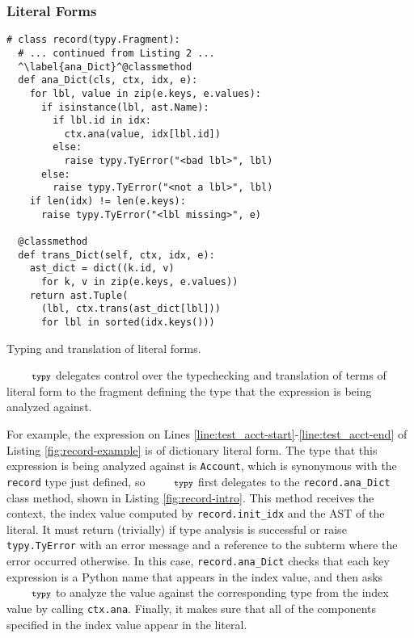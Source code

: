 \documentclass[10pt]{sigplanconf}
\newcommand{\typy}{\texttt{\footnotesize typy}}
\newcommand{\lip}[1]{\lstinline[language=Python,basicstyle=\ttfamily\footnotesize,morekeywords={with},deletendkeywords={tuple,buffer,map}]{#1}}
\newcommand{\li}[1]{\lip{#1}}
\begin{document}

\subsubsection{Literal Forms}\label{sec:literals}
\begin{codelisting}[t]
\vspace{-3px}
\begin{lstlisting}
# class record(typy.Fragment): 
  # ... continued from Listing 2 ...
  ^\label{ana_Dict}^@classmethod
  def ana_Dict(cls, ctx, idx, e):
    for lbl, value in zip(e.keys, e.values):
      if isinstance(lbl, ast.Name):
        if lbl.id in idx: 
          ctx.ana(value, idx[lbl.id])
        else: 
          raise typy.TyError("<bad lbl>", lbl)
      else: 
        raise typy.TyError("<not a lbl>", lbl)
    if len(idx) != len(e.keys): 
      raise typy.TyError("<lbl missing>", e)

  @classmethod
  def trans_Dict(self, ctx, idx, e): 
    ast_dict = dict((k.id, v) 
      for k, v in zip(e.keys, e.values))
    return ast.Tuple(
      (lbl, ctx.trans(ast_dict[lbl]))
      for lbl in sorted(idx.keys()))
\end{lstlisting}
\caption{Typing and translation of literal forms.}
\label{fig:record-intro}
\end{codelisting}
$\typy$ delegates control over the typechecking and translation of terms of literal form to the fragment defining the type that the expression is being analyzed against. 

For example, the expression on Lines \ref{line:test_acct-start}-\ref{line:test_acct-end} of Listing \ref{fig:record-example} is of dictionary literal form. The type that this expression is being analyzed against is \li{Account}, which is synonymous with the \li{record} type just defined, so $\typy$ first delegates to the \li{record.ana_Dict} class method, shown in Listing \ref{fig:record-intro}. This method receives the context, the index value computed by \li{record.init_idx} and the AST of the literal. It must return (trivially) if type analysis is successful or raise \li{typy.TyError} with an error message and a reference to the subterm where the error occurred otherwise. In this case, \li{record.ana_Dict} checks that each key expression is a Python name that appears in the index value, and then asks $\typy$ to analyze the value against the corresponding type from the index value by calling \li{ctx.ana}. Finally, it makes sure that all of the components specified in the index value appear in the literal.
\end{document}
